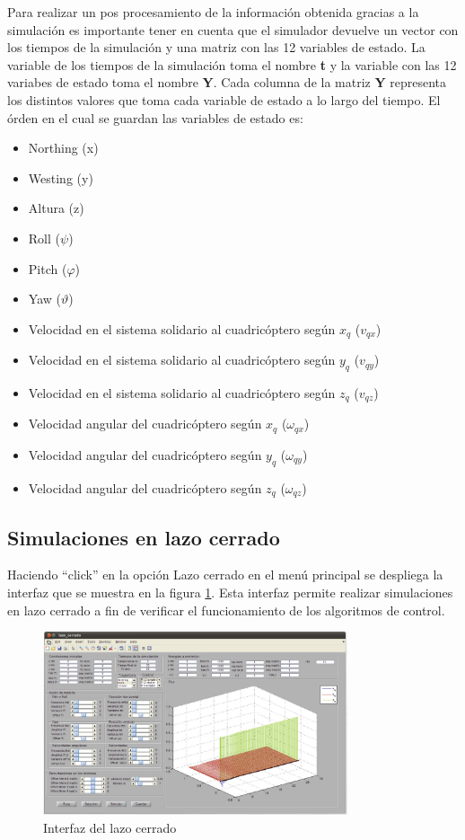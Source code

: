 \documentclass[main]{subfiles}
\begin{document}
Para realizar un pos procesamiento de la informaci\'on obtenida gracias a la simulaci\'on es importante tener en cuenta que el simulador devuelve un vector con los tiempos de la simulaci\'on y una matriz con las 12 variables de estado. La variable de los tiempos de la simulaci\'on toma el nombre \textbf{t} y la variable con las 12 variabes de estado toma el nombre \textbf{Y}. Cada columna de la matriz \textbf{Y} representa los distintos valores que toma cada variable de estado a lo largo del tiempo. El \'orden en el cual se guardan las variables de estado es:
\begin{itemize}
\item Northing (x)
\item Westing (y)
\item Altura (z)
\item Roll ($\psi$)
\item Pitch ($\varphi$)
\item Yaw ($\vartheta$)
\item Velocidad en el sistema solidario al cuadric\'optero seg\'un $x_q$ ($v_{qx}$)
\item Velocidad en el sistema solidario al cuadric\'optero seg\'un $y_q$ ($v_{qy}$)
\item Velocidad en el sistema solidario al cuadric\'optero seg\'un $z_q$ ($v_{qz}$)
\item Velocidad angular del cuadric\'optero seg\'un $x_q$ ($\omega_{qx}$)
\item Velocidad angular del cuadric\'optero seg\'un $y_q$ ($\omega_{qy}$)
\item Velocidad angular del cuadric\'optero seg\'un $z_q$ ($\omega_{qz}$)
\end{itemize} 

\subsection*{Simulaciones en lazo cerrado}
Haciendo ``click'' en la opci\'on Lazo cerrado en el men\'u principal se despliega la interfaz que se muestra en la figura \ref{fig:anexo:lazo_cerrado}. Esta interfaz permite realizar simulaciones en lazo cerrado a fin de verificar el funcionamiento de los algoritmos de control.
\begin{figure}
\centering
  \includegraphics[width=0.8\textwidth]{./pics_anexo_simulador/anexo:lazo_cerrado.pdf}
\caption{Interfaz del lazo cerrado}
\vspace{-20pt}
\label{fig:anexo:lazo_cerrado}
\end{figure} 
\end{document}
